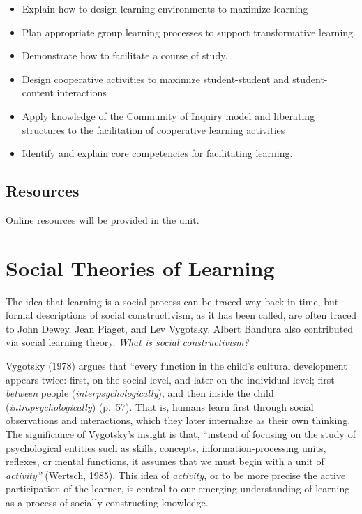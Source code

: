 \documentclass[
]{book}
\providecommand{\tightlist}{%
  \setlength{\itemsep}{0pt}\setlength{\parskip}{0pt}}
\begin{document}
\begin{itemize}
\tightlist
\item
  Explain how to design learning environments to maximize learning
\item
  Plan appropriate group learning processes to support transformative learning.
\item
  Demonstrate how to facilitate a course of study.
\item
  Design cooperative activities to maximize student-student and student-content interactions
\item
  Apply knowledge of the Community of Inquiry model and liberating structures to the facilitation of cooperative learning activities
\item
  Identify and explain core competencies for facilitating learning.
\end{itemize}

\hypertarget{resources-3}{%
\subsection*{Resources}\label{resources-3}}

Online resources will be provided in the unit.

\hypertarget{social-theories-of-learning}{%
\section{Social Theories of Learning}\label{social-theories-of-learning}}

The idea that learning is a social process can be traced way back in time, but formal descriptions of social constructivism, as it has been called, are often traced to John Dewey, Jean Piaget, and Lev Vygotsky. Albert Bandura also contributed via social learning theory. \emph{What is social constructivism?}

Vygotsky (1978) argues that ``every function in the child's cultural development appears twice: first, on the social level, and later on the individual level; first \emph{between} people (\emph{interpsychologically}), and then inside the child (\emph{intrapsychologically}) (p.~57). That is, humans learn first through social observations and interactions, which they later internalize as their own thinking. The significance of Vygotsky's insight is that, ``instead of focusing on the study of psychological entities such as skills, concepts, information-processing units, reflexes, or mental functions, it assumes that we must begin with a unit of \emph{activity''} (Wertsch, 1985). This idea of \emph{activity,} or to be more precise the active participation of the learner, is central to our emerging understanding of learning as a process of socially constructing knowledge.
\end{document}
